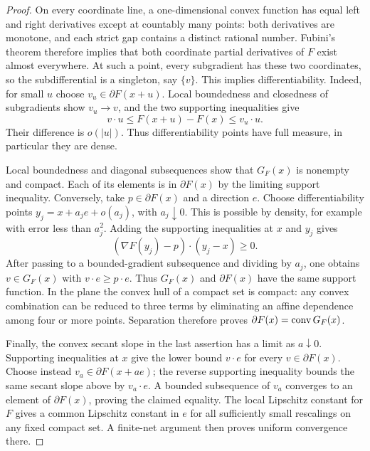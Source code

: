 \begin{proof}
On every coordinate line, a one-dimensional convex function has equal left
and right derivatives except at countably many points: both derivatives
are monotone, and each strict gap contains a distinct rational number.
Fubini's theorem therefore implies that both coordinate partial derivatives
of $F$ exist almost everywhere. At such a point, every subgradient has these
two coordinates, so the subdifferential is a singleton, say $\{v\}$.
This implies differentiability. Indeed, for small $u$ choose
$v_u\in\partial F(x+u)$. Local boundedness and closedness of subgradients
show $v_u\to v$, and the two supporting inequalities give
\[
 v\cdot u\le F(x+u)-F(x)\le v_u\cdot u.
\]
Their difference is $o(|u|)$. Thus differentiability points have full
measure, in particular they are dense.

Local boundedness and diagonal subsequences show that $G_F(x)$ is nonempty
and compact. Each of its elements is in $\partial F(x)$ by the limiting
support inequality. Conversely, take $p\in\partial F(x)$ and a direction
$e$. Choose differentiability points
$y_j=x+a_je+o(a_j)$, with $a_j\downarrow0$. This is possible by density,
for example with error less than $a_j^2$. Adding the supporting
inequalities at $x$ and $y_j$ gives
\[
 (\nabla F(y_j)-p)\cdot(y_j-x)\ge0.
\]
After passing to a bounded-gradient subsequence and dividing by $a_j$,
one obtains $v\in G_F(x)$ with $v\cdot e\ge p\cdot e$.
Thus $G_F(x)$ and $\partial F(x)$ have the same support function.
In the plane the convex hull of a compact set is compact: any convex
combination can be reduced to three terms by eliminating an affine
dependence among four or more points. Separation therefore proves
$\partial F(x)=\operatorname{conv} G_F(x)$.

Finally, the convex secant slope in the last assertion has a limit as
$a\downarrow0$. Supporting inequalities at $x$ give the lower bound
$v\cdot e$ for every $v\in\partial F(x)$. Choose instead
$v_a\in\partial F(x+ae)$; the reverse supporting inequality bounds the
same secant slope above by $v_a\cdot e$. A bounded subsequence of $v_a$
converges to an element of $\partial F(x)$, proving the claimed equality.
The local Lipschitz constant for $F$ gives a common Lipschitz constant
in $e$ for all sufficiently small rescalings on any fixed compact set.
A finite-net argument then proves uniform convergence there.
\end{proof}
